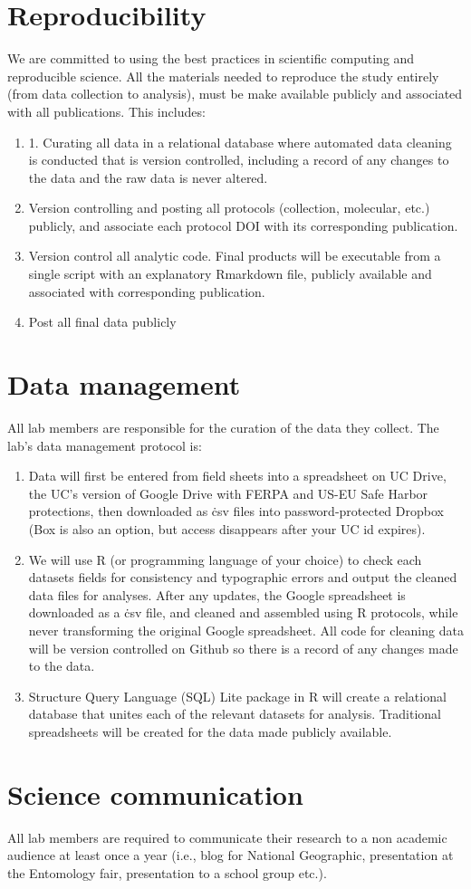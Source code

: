 \documentclass[12pt]{article}
\begin{document}
\section{Reproducibility}
We are committed to using the best practices in scientific computing
and reproducible science. All the
materials needed to reproduce the study entirely (from data collection
to analysis), must be make available publicly and associated with all
publications. This includes:
\begin{enumerate}
\item 1. Curating all data in a relational database where automated
  data cleaning is conducted that is version controlled, including a
  record of any changes to the data and the raw data is never altered.
\item Version controlling and posting all protocols (collection,
  molecular, etc.) publicly, and associate each protocol DOI with its
  corresponding publication.
\item Version control all analytic code. Final products will be
  executable from a single script with an explanatory Rmarkdown file,
  publicly available and associated with corresponding publication.
\item Post all final data publicly
\end{enumerate}

\section{Data management}
All lab members are responsible for the curation of the data they
collect. The lab's data management protocol is:

\begin{enumerate}
\item Data will first be entered from field sheets into a spreadsheet
  on UC Drive, the UC’s version of Google Drive with FERPA and US-EU
  Safe Harbor protections, then downloaded as \.csv files into
  password-protected Dropbox (Box is also an option, but access
  disappears after your UC id expires).
\item We will use R (or programming language of your choice) to check
  each datasets fields for consistency and typographic errors and
  output the cleaned data files for analyses. After any updates, the
  Google spreadsheet is downloaded as a \.csv file, and cleaned and
  assembled using R protocols, while never transforming the original
  Google spreadsheet. All code for cleaning data will be version
  controlled on Github so there is a record of any changes made to the
  data.
\item Structure Query Language (SQL) Lite package in R will create a
  relational database that unites each of the relevant datasets for
  analysis. Traditional spreadsheets will be created for the data made
  publicly available.
\end{enumerate}

\section{Science communication}
All lab members are required to communicate their research to a non
academic audience at least once a year (i.e., blog for National
Geographic, presentation at the Entomology fair, presentation to a
school group etc.).
\end{document}
